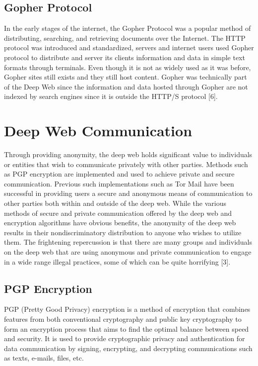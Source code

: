 \documentclass[twocolumn,letterpaper,10pt]{article}
\begin{document}
\subsection{Gopher Protocol}

In the early stages of the internet, the Gopher Protocol was a popular method of distributing, searching, and retrieving documents over the Internet. The HTTP protocol was introduced and standardized, servers and internet users used Gopher protocol to distribute and server its clients information and data in simple text formats through terminals. Even though it is not as widely used as it was before, Gopher sites still exists and they still host content. Gopher was technically part of the Deep Web since the information and data hosted through Gopher are not indexed by search engines since it is outside the HTTP/S protocol [6].

\section{Deep Web Communication}

Through providing anonymity, the deep web holds significant value to individuals or entities that wish to communicate privately with other parties. Methods such as PGP encryption are implemented and used to achieve private and secure communication. Previous such implementations such as Tor Mail have been successful in providing users a secure and anonymous means of communication to other parties both within and outside of the deep web. While the various methods of secure and private communication offered by the deep web and encryption algorithms have obvious benefits, the anonymity of the deep web results in their nondiscriminatory distribution to anyone who wishes to utilize them. The frightening repercussion is that there are many groups and individuals on the deep web that are using anonymous and private communication to engage in a wide range illegal practices, some of which can be quite horrifying [3]. 

\subsection{PGP Encryption}

PGP (Pretty Good Privacy) encryption is a method of encryption that combines features from both conventional cryptography and public key cryptography to form an encryption process that aims to find the optimal balance between speed and security. It is used to provide cryptographic privacy and authentication for data communication by signing, encrypting, and decrypting communications such as texts, e-mails, files, etc.
\end{document}
